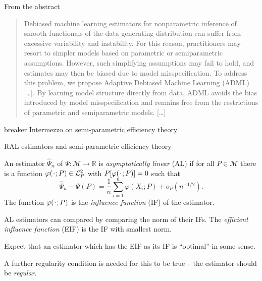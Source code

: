 \documentclass[smaller]{beamer}\usepackage{listings}
\newcommand{\R}{\mathbb{R}}
\newcommand{\blank}{\makebox[1ex]{\textbf{$\cdot$}}}
\renewcommand{\phi}{\varphi}
\newcommand\smallO{\textit{o}}
\newcommand{\1}{\mathds{1}}
\begin{document}
\begin{frame}[label={sec:org7bba150}]{From the abstract}
\begin{quote} %
Debiased machine learning estimators for nonparametric inference of smooth
functionals of the data-generating distribution can suffer from excessive
variability and instability. For this reason, practitioners may resort to
simpler models based on parametric or semiparametric assumptions. However, such
simplifying assumptions may fail to hold, and estimates may then be biased due
to model misspecification. To address this problem, we propose Adaptive Debiased
Machine Learning (ADML) [\ldots{}]. By learning model structure directly from data,
ADML avoids the bias introduced by model misspecification and remains free from
the restrictions of parametric and semiparametric models. [\ldots{}]

\flushright \cite{van2023adaptive}
\end{quote}
\end{frame}


\begin{frame}[label={sec:org4a51930}]{\color{white} breaker}
\huge\centering \color{bblue} Intermezzo on semi-parametric efficiency theory
\end{frame}

\begin{frame}[label={sec:org90acf5a}]{RAL estimators and semi-parametric efficiency theory}

An estimator \( \hat{\Psi}_n \) of $\Psi \colon \mathcal{M} \rightarrow \R$ is
\textit{asymptotically linear} (AL) if for all \( P \in \mathcal{M} \) there
is a function \( \phi(\blank; P) \in \mathcal{L}_P^2 \) with
\( P{[\phi(\blank; P)]}=0 \) such that
\begin{equation*}
  \hat{\Psi}_n - \Psi(P) = \frac{1}{n} \sum_{i=1}^{n} \phi(X_i; P) + \smallO_P{(n^{-1/2})}.
\end{equation*}
The function \( \phi(\blank; P) \) is the \textit{influence function} (IF) of
the estimator.

\vfill

AL estimators can compared by comparing the norm of their IFs. The \emph{efficient
influence function} (EIF) is the IF with smallest norm.

\vfill

Expect that an estimator which has the EIF as its IF is ``optimal'' in some sense.

\vfill

A further regularity condition is needed for this to be true -- the estimator
should be \emph{regular}.
\end{frame}
\end{document}
